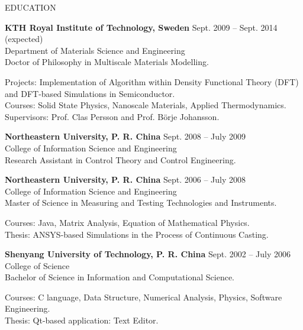 \documentclass{resume} %
\begin{document}
\begin{rSection}{EDUCATION}

{\bf KTH Royal Institute of Technology, Sweden} \hfill { Sept. 2009 -- Sept. 2014 (expected)} \\ 
Department of Materials Science and Engineering \\
Doctor of Philosophy in Multiscale Materials Modelling.

Projects: Implementation of Algorithm within Density Functional Theory (DFT) and DFT-based Simulations in Semiconductor. \\
Courses: Solid State Physics, Nanoscale Materials, Applied Thermodynamics. \\
Supervisors: Prof. Clas Persson and Prof. Börje Johansson. 

{\bf Northeastern University, P. R. China} \hfill { Sept. 2008 -- July 2009} \\ 
College of Information Science and Engineering \\
Research Assistant in Control Theory and Control Engineering.


{\bf Northeastern University, P. R. China} \hfill { Sept. 2006 -- July 2008} \\ 
College of Information Science and Engineering \\
Master of Science in Measuring and Testing Technologies and Instruments.

Courses: Java, Matrix Analysis, Equation of Mathematical Physics. \\
Thesis: ANSYS-based Simulations in the Process of Continuous Casting.

{\bf Shenyang University of Technology, P. R. China} \hfill { Sept. 2002 -- July 2006} \\ 
College of Science \\
Bachelor of Science in Information and Computational Science.

Courses: C language, Data Structure, Numerical Analysis, Physics, Software Engineering. \\
Thesis: Qt-based application: Text Editor.

\end{rSection}

\vspace*{1\baselineskip}

\end{document}
